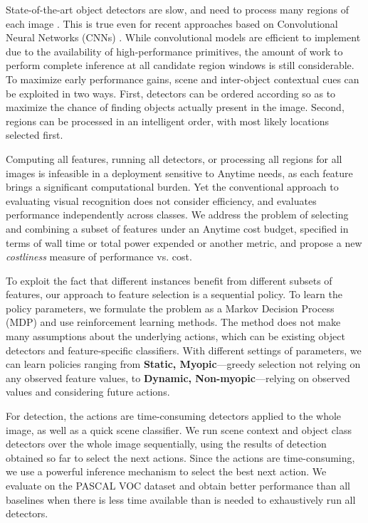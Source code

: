 State-of-the-art object detectors are slow, and need to process many regions of each image \parencite{Felzenszwalb2010a}.
This is true even for recent approaches based on Convolutional Neural Networks (CNNs) \parencite{Girshick-CVPR-2014}.
While convolutional models are efficient to implement due to the availability of high-performance primitives, the amount of work to perform complete inference at all candidate region windows is still considerable.
To maximize early performance gains, scene and inter-object contextual cues can be exploited in two ways.
First, detectors can be ordered according so as to maximize the chance of finding objects actually present in the image.
Second, regions can be processed in an intelligent order, with most likely locations selected first.

Computing all features, running all detectors, or processing all regions for all images is infeasible in a deployment sensitive to Anytime needs, as each feature brings a significant computational burden.
Yet the conventional approach to evaluating visual recognition does not consider efficiency, and evaluates performance independently across classes.
We address the problem of selecting and combining a subset of features under an Anytime cost budget, specified in terms of wall time or total power expended or another metric, and propose a new \emph{costliness} measure of performance vs. cost.

To exploit the fact that different instances benefit from different subsets of features, our approach to feature selection is a sequential policy.
To learn the policy parameters, we formulate the problem as a Markov Decision Process (MDP) and use reinforcement learning methods.
The method does not make many assumptions about the underlying actions, which can be existing object detectors and feature-specific classifiers.
With different settings of parameters, we can learn policies ranging from \textbf{Static, Myopic}---greedy selection not relying on any observed feature values, to \textbf{Dynamic, Non-myopic}---relying on observed values and considering future actions.

For detection, the actions are time-consuming detectors applied to the whole image, as well as a quick scene classifier.
We run scene context and object class detectors over the whole image sequentially, using the results of detection obtained so far to select the next actions.
Since the actions are time-consuming, we use a powerful inference mechanism to select the best next action.
We evaluate on the PASCAL VOC dataset and obtain better performance than all baselines when there is less time available than is needed to exhaustively run all detectors.

